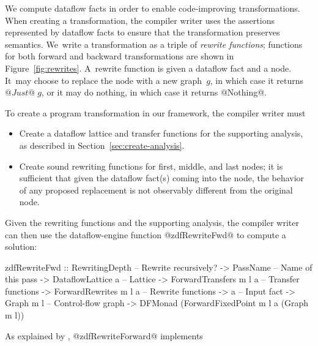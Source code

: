 \documentclass[blockstyle,preprint,nocopyrightspace]{sigplanconf}
\newcommand\secref[1]{Section~\ref{sec:#1}}
\newcommand\figref[1]{Figure~\ref{fig:#1}}
\begin{document}
We compute dataflow facts in order to enable code-improving
transformations.
When creating a transformation, the compiler writer uses
the assertions represented by dataflow facts to ensure that the
transformation preserves semantics.
We~write a transformation as a triple of
\emph{rewrite functions};
functions for both forward and backward transformations are shown in
\figref{rewrites}. 
%
A~rewrite function is given a dataflow fact and a node.
It~may choose to replace the node with a new graph~$g$, in which case it
returns $@Just@\;g$, or it may do nothing, in which case it returns @Nothing@.


To create a program transformation in our framework,
the compiler writer must 
\begin{itemize}
\item
Create a dataflow lattice and transfer functions for the supporting
analysis, as described in \secref{create-analysis}. 
\item
Create sound rewriting functions for first, middle, and last nodes;
it is sufficient that given the dataflow fact(s) coming into the node,
the behavior of 
any proposed replacement is not observably different from the original node.
\end{itemize}
Given the rewriting functions and the supporting analysis, the
compiler writer can then use the 
dataflow-engine function @zdfRewriteFwd@ to compute a solution:
\begin{code}
  zdfRewriteFwd 
    :: RewritingDepth         -- Rewrite recursively?
    -> PassName               -- Name of this pass
    -> DataflowLattice a      -- Lattice
    -> ForwardTransfers m l a -- Transfer functions
    -> ForwardRewrites m l a  -- Rewrite functions
    -> a                      -- Input fact
    -> Graph m l              -- Control-flow graph
    -> DFMonad (ForwardFixedPoint m l a (Graph m l))
\end{code}
As explained by \citet{lerner-grove-chambers:2002}, 
@zdfRewriteForward@ implements
\end{document}
